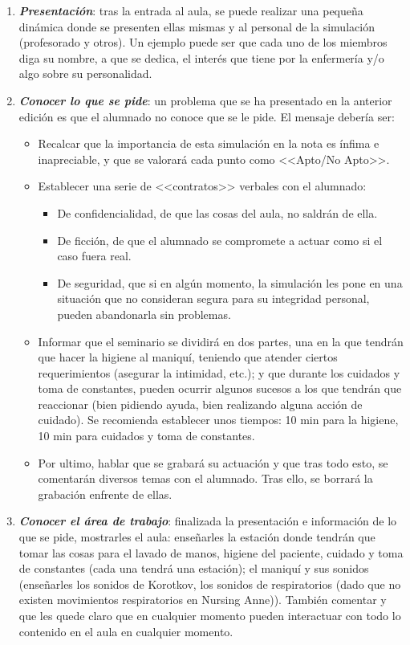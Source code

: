 \begin{enumerate}[topsep=0pt, partopsep=0pt,itemsep=0pt,parsep=0pt]
    \item \textbf{\textit{Presentación}}: tras la entrada al aula, se puede realizar una pequeña dinámica donde se presenten ellas mismas y al personal de la simulación (profesorado y otros). Un ejemplo puede ser que cada uno de los miembros diga su nombre, a que se dedica, el interés que tiene por la enfermería y/o algo sobre su personalidad.
    \item \textbf{\textit{Conocer lo que se pide}}: un problema que se ha presentado en la anterior edición es que el alumnado no conoce que se le pide. El mensaje debería ser:
    \begin{itemize}[topsep=0pt, partopsep=0pt,itemsep=0pt,parsep=0pt]
        \item Recalcar que la importancia de esta simulación en la nota es ínfima e inapreciable, y que se valorará cada punto como <<Apto/No Apto>>.
        \item Establecer una serie de <<contratos>> verbales con el alumnado:
        \begin{itemize}[topsep=0pt, partopsep=0pt,itemsep=0pt,parsep=0pt]
            \item De confidencialidad, de que las cosas del aula, no saldrán de ella.
            \item De ficción, de que el alumnado se compromete a actuar como si el caso fuera real.
            \item De seguridad, que si en algún momento, la simulación les pone en una situación que no consideran segura para su integridad personal, pueden abandonarla sin problemas.
        \end{itemize}
        \item Informar que el seminario se dividirá en dos partes, una en la que tendrán que hacer la higiene al maniquí, teniendo que atender ciertos requerimientos (asegurar la intimidad, etc.); y que durante los cuidados y toma de constantes, pueden ocurrir algunos sucesos a los que tendrán que reaccionar (bien pidiendo ayuda, bien realizando alguna acción de cuidado). Se recomienda establecer unos tiempos: 10 min para la higiene, 10 min para cuidados y toma de constantes.
        \item Por ultimo, hablar que se grabará su actuación y que tras todo esto, se comentarán diversos temas con el alumnado. Tras ello, se borrará la grabación enfrente de ellas.
    \end{itemize}
    \item \textbf{\textit{Conocer el área de trabajo}}: finalizada la presentación e información de lo que se pide, mostrarles el aula: enseñarles la estación donde tendrán que tomar las cosas para el lavado de manos, higiene del paciente, cuidado y toma de constantes (cada una tendrá una estación); el maniquí y sus sonidos (enseñarles los sonidos de Korotkov, los sonidos de respiratorios (dado que no existen movimientos respiratorios en Nursing Anne)). También comentar y que les quede claro que en cualquier momento pueden interactuar con todo lo contenido en el aula en cualquier momento.

\end{enumerate}
